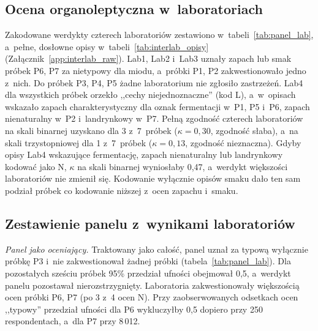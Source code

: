 \subsection{Ocena organoleptyczna w~laboratoriach}

Zakodowane werdykty czterech laboratoriów zestawiono w~tabeli~\ref{tab:panel_lab},
a~pełne, dosłowne opisy w~tabeli~\ref{tab:interlab_opisy}
(Załącznik~\ref{app:interlab_raw}). Lab1, Lab2 i~Lab3 uznały zapach lub smak
próbek P6, P7 za nietypowy dla miodu, a~próbki P1, P2
zakwestionowało jedno z~nich. Do próbek P3, P4, P5 żadne laboratorium nie
zgłosiło zastrzeżeń. Lab4 dla wszystkich próbek orzekło ,,cechy
niejednoznaczne'' (kod L), a~w~opisach wskazało zapach charakterystyczny
dla oznak fermentacji w~P1, P5 i~P6, zapach nienaturalny w~P2
i~landrynkowy w~P7. Pełną zgodność czterech laboratoriów na skali binarnej
uzyskano dla 3 z~7~próbek ($\kappa = 0{,}30$,
zgodność słaba), a~na skali trzystopniowej dla 1
z~7~próbek ($\kappa = 0{,}13$, zgodność nieznaczna). Gdyby opisy
Lab4 wskazujące fermentację, zapach nienaturalny lub landrynkowy
kodować jako N, $\kappa$ na skali binarnej wyniosłaby 0{,}47,
a~werdykt większości laboratoriów nie zmienił się. Kodowanie
wyłącznie opisów smaku dało ten sam podział próbek co kodowanie
niższej z~ocen zapachu i~smaku.

\subsection{Zestawienie panelu z~wynikami laboratoriów}

\textit{Panel jako oceniający.} Traktowany jako całość, panel uznał za
typową wyłącznie próbkę P3 i~nie zakwestionował żadnej próbki
(tabela~\ref{tab:panel_lab}). Dla pozostałych sześciu próbek 95\% przedział
ufności obejmował 0{,}5, a~werdykt panelu pozostawał nierozstrzygnięty.
Laboratoria zakwestionowały większością ocen próbki P6, P7
(po 3 z~4 ocen N). Przy zaobserwowanych odsetkach
ocen ,,typowy'' przedział ufności dla P6 wykluczyłby 0{,}5 dopiero przy
250 respondentach, a~dla P7 przy 8\,012.

